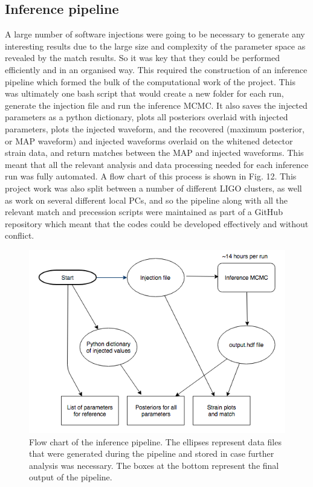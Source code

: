 \documentclass[11pt]{article}
\begin{document}
\subsection{Inference pipeline}
A large number of software injections were going to be necessary to generate any interesting results due to the large size and complexity of the parameter space as revealed by the match results. So it was key that they could be performed efficiently and in an organised way. This required the construction of an inference pipeline which formed the bulk of the computational work of the project. This was ultimately one bash script that would create a new folder for each run, generate the injection file and run the inference MCMC.  It also saves the injected parameters as a python dictionary, plots all posteriors overlaid with injected parameters, plots the injected waveform, and the recovered (maximum posterior, or MAP waveform) and injected waveforms overlaid on the whitened detector strain data, and return matches between the MAP and injected waveforms. This meant that all the relevant analysis and data processing needed for each inference run was fully automated. A flow chart of this process is shown in Fig. 12.
This project work was also split between a number of different LIGO clusters, as well as work on several different local PCs, and so the pipeline along with all the relevant match and precession scripts were maintained as part of a GitHub repository which meant that the codes could be developed effectively and without conflict.
\begin{figure}[h]
	\includegraphics[scale=0.55]{fig13.png}
	\centering
	\caption{Flow chart of the inference pipeline. The ellipses represent data files that were generated during the pipeline and stored in case further analysis was necessary. The boxes at the bottom represent the final output of the pipeline.}
	\centering
\end{figure}
\end{document}
